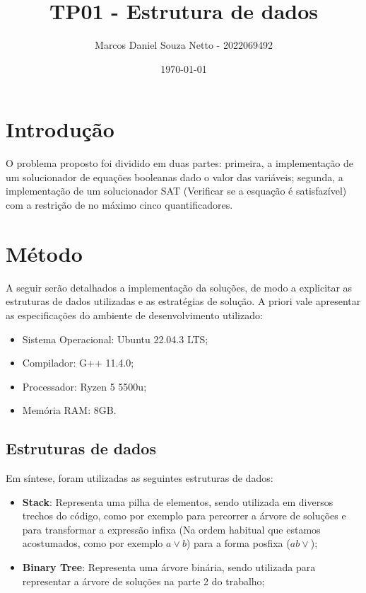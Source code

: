 \documentclass{article}
\title{TP01 - Estrutura de dados}
\author{Marcos Daniel Souza Netto - 2022069492}
\date{\today}
\begin{document}
\maketitle

\section{Introdução}

O problema proposto foi dividido em duas partes: primeira, a implementação 
de um solucionador de equações booleanas dado o valor das variáveis; segunda,
a implementação de um solucionador SAT (Verificar se a esquação é satisfazível) 
com a restrição de no máximo cinco quantificadores.

\section{Método}

A seguir serão detalhados a implementação da soluções, de modo a explicitar 
as estruturas de dados utilizadas e as estratégias de solução. A priori vale 
apresentar as especificações do ambiente de desenvolvimento utilizado:

\begin{itemize}
    \item Sistema Operacional: Ubuntu 22.04.3 LTS;
    \item Compilador: G++ 11.4.0;
    \item Processador: Ryzen 5 5500u;
    \item Memória RAM: 8GB.
\end{itemize}


\subsection{Estruturas de dados}

Em síntese, foram utilizadas as seguintes estruturas de dados:

\begin{itemize}
    \item \textbf{Stack}: Representa uma pilha de elementos, sendo utilizada em diversos trechos do código, como por exemplo para percorrer a árvore de soluções e para transformar a expressão infixa (Na ordem habitual que estamos acostumados, como por exemplo $a \lor b$) para a forma posfixa ($a b \lor$);
    \item \textbf{Binary Tree}: Representa uma árvore binária, sendo utilizada para representar a árvore de soluções na parte 2 do trabalho;
\end{itemize}
\end{document}
